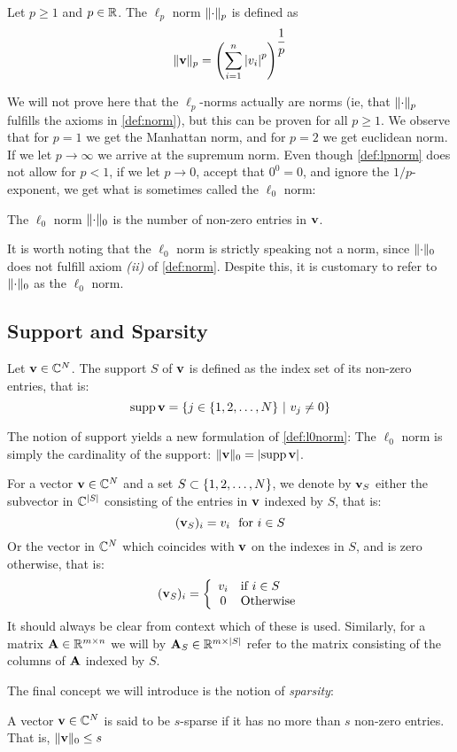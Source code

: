 \begin{definition} \label{def:lpnorm}
	Let $ p \geq 1 $ and $ p \in \mathbb{R} $. The $ \ell_{p} $ norm $ \lVert\cdot\rVert_{p} $ is defined as
	\[
		\lVert\mathbf{v}\rVert_{p} = \left( \sum_{i=1}^{n} \left|v_{i}\right|^{p} \right)^{\dfrac{1}{p}}
	\]
\end{definition}

We will not prove here that the $ \ell_{p} $-norms actually are norms (ie, that $ \lVert\cdot\rVert_{p} $ fulfills the axioms in \cref{def:norm}), but this can be proven for all $ p\geq 1 $. We observe that for $ p=1 $ we get the Manhattan norm, and for $ p=2 $ we get euclidean norm. If we let $ p\to\infty $ we arrive at the supremum norm. Even though \cref{def:lpnorm} does not allow for $ p < 1 $, if we let $ p\to0 $, accept that $ 0^{0} = 0 $, and ignore the $ 1/p $-exponent, we get what is sometimes called the $ \ell_{0} $ norm:

\begin{definition} \label{def:l0norm}
	The $ \ell_{0} $ norm $ \lVert\cdot\rVert_{0} $ is the number of non-zero entries in $ \mathbf{v} $.
\end{definition}

It is worth noting that the $ \ell_{0} $ norm is strictly speaking not a norm, since $ \lVert\cdot\rVert_{0} $ does not fulfill axiom \textit{(ii)} of \cref{def:norm}. Despite this, it is customary to refer to $ \lVert\cdot\rVert_{0} $ as the $ \ell_{0} $ norm.

\subsection{Support and Sparsity}

\begin{definition} \label{def:support}
	Let $ \mathbf{v} \in \mathbb{C}^{N} $. The support $ S $ of $ \mathbf{v} $ is defined as the index set of its non-zero entries, that is:
	\[
		\operatorname{supp} \mathbf{v} = \{j \in \{1, 2, \ldots, N\} ~|~ v_{j} \neq 0\}
	\]
\end{definition}

The notion of support yields a new formulation of \cref{def:l0norm}: The $ \ell_{0} $ norm is simply the cardinality of the support: $ \lVert\mathbf{v}\rVert_{0} = \left|\operatorname{supp} \mathbf{v}\right| $.

For a vector $ \mathbf{v}\in\mathbb{C}^{N} $ and a set $ S \subset \{1, 2, \ldots, N\} $, we denote by $ \mathbf{v}_{S} $ either the subvector in $ \mathbb{C}^{\left|S\right|} $ consisting of the entries in $ \mathbf{v} $ indexed by $ S $, that is:
\begin{equation}
	\label{eq:vSalt1}
	(\mathbf{v}_{S})_{i} = v_{i} \text{~~for } i \in S
\end{equation}
Or the vector in $ \mathbb{C}^{N} $ which coincides with $ \mathbf{v} $ on the indexes in $ S $, and is zero otherwise, that is:
\begin{equation}
	\label{eq:vSalt2}
	(\mathbf{v}_{S})_{i} = \left\{ \begin{array}{cl} v_{i} & \text{if } i \in S \\ 0 & \text{Otherwise} \end{array} \right.
\end{equation}
It should always be clear from context which of these is used. Similarly, for a matrix $ \mathbf{A}\in\mathbb{R}^{m \times n} $ we will by $ \mathbf{A}_{S} \in \mathbb{R}^{m \times \left|S\right|} $ refer to the matrix consisting of the columns of $ \mathbf{A} $ indexed by $ S $.

The final concept we will introduce is the notion of \textit{sparsity}:

\begin{definition} A vector $ \mathbf{v} \in \mathbb{C}^{N} $ is said to be $ s $-sparse if it has no more than $ s $ non-zero entries. That is, $ \lVert\mathbf{v}\rVert_{0} \leq s $
\end{definition}

